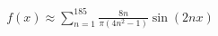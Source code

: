 \documentclass[preview]{standalone}
\begin{document}
\begin{align*}
f(x) \approx \sum_{n=1}^{185} \frac{8n}{\pi(4n^2-1)} \sin(2nx)
\end{align*}
\end{document}
